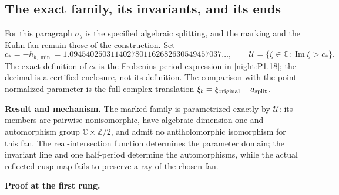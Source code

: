 \documentclass[11pt,a4paper]{article}
\theoremstyle{definition}
\newcommand{\RungZero}[1]{\par\noindent\textbf{Result and mechanism.} #1\par\smallskip}
\newcommand{\RungOne}{\par\Needspace{6\baselineskip}\noindent\textbf{Proof at the first rung.}\par\nobreak\smallskip}
\begin{document}
\subsection{The exact family, its invariants, and its ends}
For this paragraph $\sigma_b$ is the specified algebraic splitting,
and the marking and the Kuhn fan remain those of the construction.
Set
\[
 c_*=-h_{b,\min}=1.0945402503114027801162682630549457037\ldots,
 \qquad \mathcal U=\{\xi\in\mathbb C:\operatorname{Im}\xi>c_*\}.
\]
The exact definition of $c_*$ is the Frobenius period expression in
\cref{night:P1.18}; the decimal is a certified enclosure, not its
definition.  The comparison with the point-normalized parameter is
the full complex translation $\xi_b=\xi_{\rm original}-a_{\rm split}$.

\RungZero{The marked family is parametrized exactly by $\mathcal U$:
its members are pairwise nonisomorphic, have algebraic dimension one
and automorphism group $\mathbb C\times\mathbb Z/2$, and admit no
antiholomorphic isomorphism for this fan.  The real-intersection
function determines the parameter domain; the invariant line and
one half-period determine the automorphisms, while the actual
reflected cusp map fails to preserve a ray of the chosen fan.}
\RungOne
\end{document}
